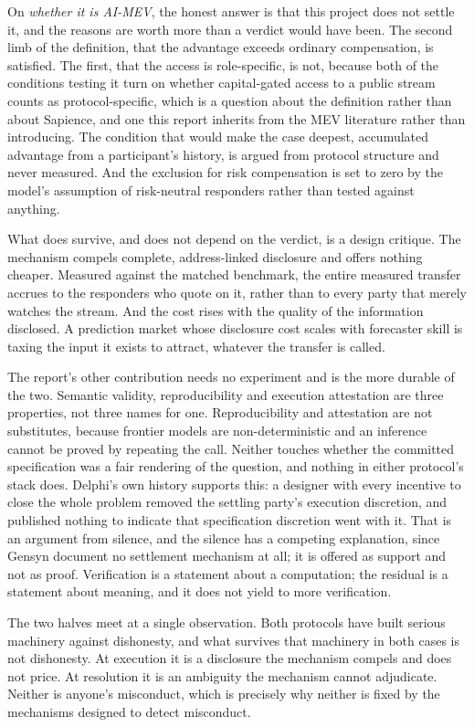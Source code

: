 On \emph{whether it is AI-MEV}, the honest answer is that this project does not settle it,
and the reasons are worth more than a verdict would have been. The second limb of the
definition, that the advantage exceeds ordinary compensation, is satisfied. The first, that
the access is role-specific, is not, because both of the conditions testing it turn on whether capital-gated access to a public stream counts as
protocol-specific, which is a question about the definition rather than about Sapience, and
one this report inherits from the MEV literature rather than introducing. The condition that
would make the case deepest, accumulated advantage from a participant's history, is argued
from protocol structure and never measured. And the exclusion for risk compensation is set
to zero by the model's assumption of risk-neutral responders rather than tested against
anything.

What does survive, and does not depend on the verdict, is a design critique. The mechanism
compels complete, address-linked disclosure and offers nothing cheaper. Measured against the
matched benchmark, the entire measured transfer accrues to the responders who quote on it,
rather than to every party that merely watches the stream. And the cost rises with the quality of the information disclosed. A
prediction market whose disclosure cost scales with forecaster skill is taxing the input it
exists to attract, whatever the transfer is called.

The report's other contribution needs no experiment and is the more durable of the two.
Semantic validity, reproducibility and execution attestation are three properties, not three
names for one. Reproducibility and attestation are not substitutes, because frontier models
are non-deterministic and an inference cannot be proved by repeating the call. Neither
touches whether the committed specification was a fair rendering of the question, and
nothing in either protocol's stack does. Delphi's own history supports this: a designer with
every incentive to close the whole problem removed the settling party's execution
discretion, and published nothing to indicate that specification discretion went with it.
That is an argument from silence, and the silence has a competing explanation, since Gensyn
document no settlement mechanism at all; it is offered as support and not as proof.
Verification is
a statement about a computation; the residual is a statement about meaning, and it does not
yield to more verification.

The two halves meet at a single observation. Both protocols have built serious machinery
against dishonesty, and what survives that machinery in both cases is not dishonesty. At
execution it is a disclosure the mechanism compels and does not price. At resolution it is
an ambiguity the mechanism cannot adjudicate. Neither is anyone's misconduct, which is
precisely why neither is fixed by the mechanisms designed to detect misconduct.


